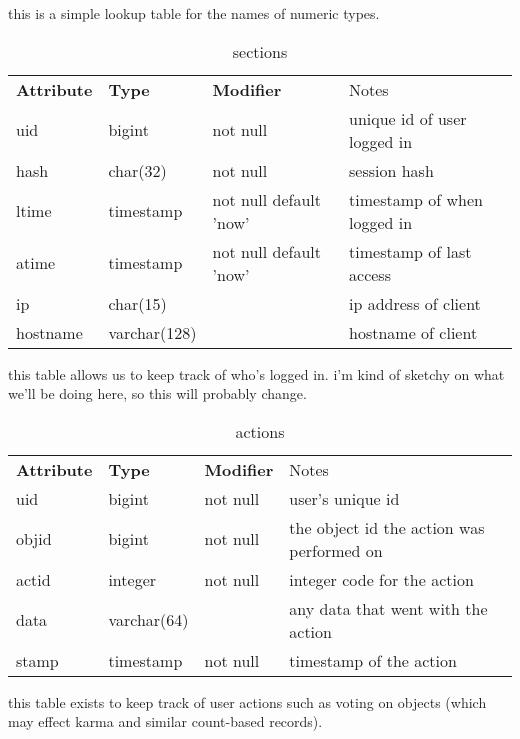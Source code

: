 this is a simple lookup table for the names of numeric types.

\begin{table}
\begin{center}
\begin{tabular}{llll}
{\bf Attribute } & {\bf Type} & {\bf Modifier} & Notes \\
 uid       & bigint    & not null              &  unique id of user logged in \\
 hash      & char(32)  & not null              &  session hash \\
 ltime     & timestamp & not null default 'now'&  timestamp of when logged in \\
 atime     & timestamp & not null default 'now'&  timestamp of last access \\
 ip        & char(15)  &                       &  ip address of client \\
 hostname  & varchar(128) &                    &   hostname of client 
\end{tabular}
\end{center}
\caption{sections}
\end{table}

this table allows us to keep track of who's logged in. i'm kind of sketchy on what we'll be doing here, so this will probably change.

\begin{table}
\begin{center}
\begin{tabular}{llll}
{\bf Attribute } & {\bf Type} & {\bf Modifier} & Notes \\
 uid       & bigint      & not null  &   user's unique id \\
 objid     & bigint      & not null  &   the object id the action was performed on \\
 actid     & integer     & not null  &   integer code for the action \\
 data      & varchar(64) &           &   any data that went with the action \\
 stamp     & timestamp   & not null  &   timestamp of the action 
\end{tabular}
\end{center}
\caption{actions}
\end{table}

this table exists to keep track of user actions such as voting on objects (which may effect karma and similar count-based records).  

